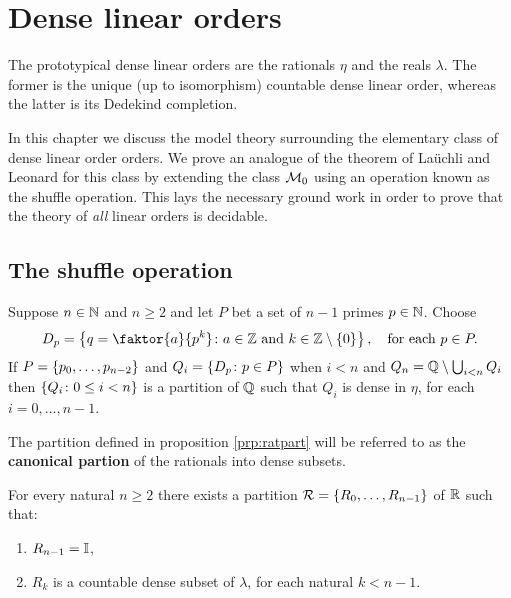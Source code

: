 
\chapter{Dense linear orders}

The prototypical dense linear orders are the rationals $\eta$ and the reals
$\lambda$.  The former is the unique (up to isomorphism) countable dense linear
order, whereas the latter is its Dedekind completion.

In this chapter we discuss the model theory surrounding the elementary class of
dense linear order orders.  We prove an analogue of the theorem of La\"uchli and
Leonard for this class by extending the class $\mathcal{M}_0$ using an operation known
as the shuffle operation.  This lays the necessary ground work in order to prove
that the theory of \textit{all} linear orders is decidable.

\section{The shuffle operation}

\begin{prp}\label{prp:ratpart}
	Suppose $n\in\mathbb{N}$ and $n\geq 2$ and let $P$ bet a set of $n-1$ primes $p\in\mathbb{N}$.  Choose
	\begin{equation}
		D_p=\setbuild{q=\faktor{a}{p^k}}{a\in\ints\text{ and }k\in\ints\setminus\set{0}},\quad\text{for each }p\in P.
	\end{equation}
	If $P=\left\lbrace p_0,\dotsc,p_{n-2}\right\rbrace$ and $Q_i=\left\lbrace D_p\colon p\in P \right\rbrace$ when $i<n$ and $Q_n=\mathbb{Q}\setminus\bigcup_{i<n}Q_i$ then $\left\lbrace Q_i\colon 0\leq i<n \right\rbrace$ is a partition of $\mathbb{Q}$ such that $Q_i$ is dense in $\eta$, for each $i=0,\dotsc,n-1$.
\end{prp}

\begin{dfn}
	The partition defined in proposition \ref{prp:ratpart} will be referred to as the \textbf{canonical partion} of the rationals into dense subsets.
\end{dfn}

\begin{cor}
	For every natural $n\geq 2$ there exists a partition $\mathcal{R}=\left\lbrace R_0,\dotsc,R_{n-1}\right\rbrace$ of $\mathbb{R}$ such that:
	\begin{enumerate}
		\item $R_{n-1}=\mathbb{I}$,
		\item $R_k$ is a countable dense subset of $\lambda$, for each natural $k<n-1$.
	\end{enumerate}
\end{cor}


